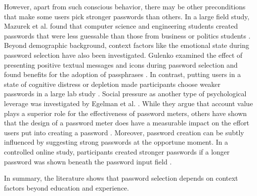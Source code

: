 However, apart from such conscious behavior, there may be other preconditions that make some users pick stronger passwords than others. In a large field study, Mazurek et al. found that computer science and engineering students created passwords that were less guessable than those from business or politics students \cite{Mazurek2013Measuring}. Beyond demographic background, context factors like the emotional state during password selection have also been investigated. Gulenko examined the effect of presenting positive textual messages and icons during password selection and found benefits for the adoption of passphrases \cite{Gulenko2014PasswordsEmotion}. In contrast, putting users in a state of cognitive distress or depletion made participants choose weaker passwords in a large lab study \cite{Gross2016EffectCognitiveEffort}. Social pressure as another type of psychological leverage was investigated by Egelman et al. \cite{Egelman2013DoesMyPasswordGoUpToEleven}. While they argue that account value plays a superior role for the effectiveness of password meters, others have shown that the design of a password meter does have a measurable impact on the effort users put into creating a password \cite{Ur2012HowDoesYourPasswordMeasureUp}. Moreover, password creation can be subtly influenced by suggesting strong passwords at the opportune moment. In a controlled online study, participants created stronger passwords if a longer password was shown beneath the password input field \cite{Seitz2016SuggestionsDecoy}. 

In summary, the literature shows that password selection depends on context factors beyond education and experience. 
